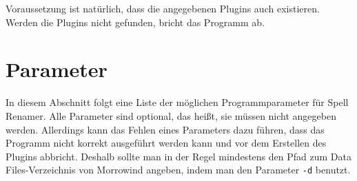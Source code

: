 \documentclass[12pt,twoside,a4paper]{article}
\begin{document}
Voraussetzung ist nat\"{u}rlich, dass die angegebenen Plugins auch existieren.
Werden die Plugins nicht gefunden, bricht das Programm ab.

\section{Parameter}
In diesem Abschnitt folgt eine Liste der m\"{o}glichen Programmparameter f\"{u}r Spell Renamer.
Alle Parameter sind optional, das hei\ss{}t, sie m\"{u}ssen nicht angegeben werden.
Allerdings kann das Fehlen eines Parameters dazu f\"{u}hren, dass das Programm nicht
korrekt ausgef\"{u}hrt werden kann und vor dem Erstellen des Plugins abbricht.
Deshalb sollte man in der Regel mindestens den Pfad zum Data Files-Verzeichnis
von Morrowind angeben, indem man den Parameter \texttt{-d} benutzt.
\newline
\end{document}
